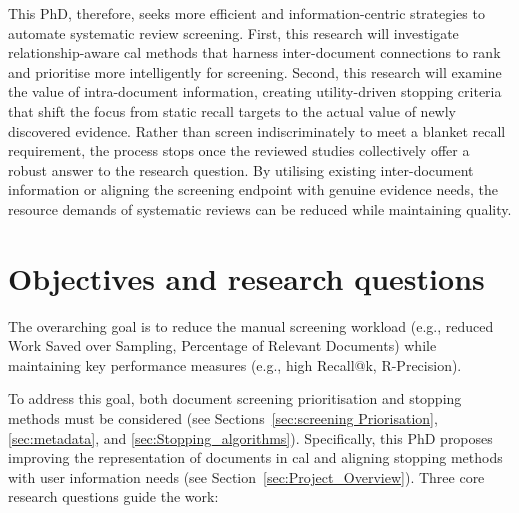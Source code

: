 \documentclass[10pt,oneside]{book}
\begin{document}
This PhD, therefore, seeks more efficient and information-centric strategies to automate systematic review screening. First, this research will investigate relationship-aware \gls*{cal} methods that harness inter-document connections to rank and prioritise more intelligently for screening. Second, this research will examine the value of intra-document information, creating utility-driven stopping criteria that shift the focus from static recall targets to the actual value of newly discovered evidence. Rather than screen indiscriminately to meet a blanket recall requirement, the process stops once the reviewed studies collectively offer a robust answer to the research question. By utilising existing inter-document information or aligning the screening endpoint with genuine evidence needs, the resource demands of systematic reviews can be reduced while maintaining quality.




\section{Objectives and research questions}

The overarching goal is to reduce the manual screening workload (e.g., reduced Work Saved over Sampling, Percentage of Relevant Documents) while maintaining key performance measures (e.g., high Recall@k, R-Precision).

To address this goal, both document screening prioritisation and stopping methods must be considered (see Sections~\ref{sec:screening Priorisation}, \ref{sec:metadata}, and \ref{sec:Stopping_algorithms}). Specifically, this PhD proposes improving the representation of documents in \gls*{cal} and aligning stopping methods with user information needs (see Section~\ref{sec:Project_Overview}). Three core research questions guide the work:
\end{document}
